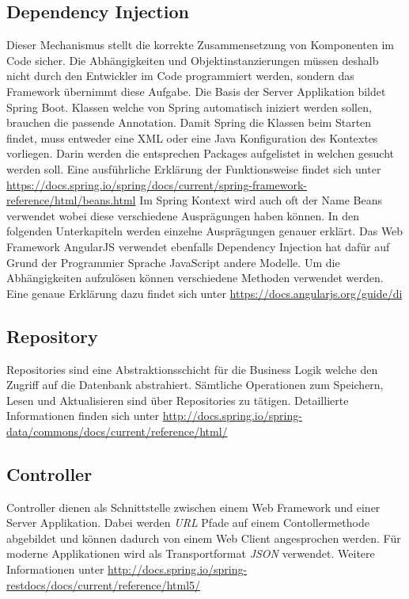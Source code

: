 \subsection{Dependency Injection}

Dieser Mechanismus stellt die korrekte Zusammensetzung von Komponenten im Code sicher. Die Abhängigkeiten und Objektinstanzierungen  müssen deshalb nicht durch den Entwickler im Code programmiert werden, sondern das Framework übernimmt diese Aufgabe. Die Basis der Server Applikation bildet Spring Boot. Klassen welche von Spring automatisch iniziert werden sollen, brauchen die passende Annotation.
Damit Spring die Klassen beim Starten findet, muss entweder eine XML oder eine Java Konfiguration des Kontextes vorliegen. Darin werden die entsprechen Packages aufgelistet in welchen gesucht werden soll. Eine ausführliche Erklärung der Funktionsweise findet sich unter \url{https://docs.spring.io/spring/docs/current/spring-framework-reference/html/beans.html}\newline
Im Spring Kontext wird auch oft der Name Beans verwendet wobei diese verschiedene Ausprägungen haben können. In den folgenden Unterkapiteln werden einzelne Ausprägungen genauer erklärt.\newline
Das Web Framework AngularJS verwendet ebenfalls Dependency Injection hat dafür auf Grund der Programmier Sprache JavaScript andere Modelle. Um die Abhängigkeiten aufzulösen können verschiedene Methoden verwendet werden. Eine genaue Erklärung dazu findet sich unter \url{https://docs.angularjs.org/guide/di}

\subsection{Repository}

Repositories sind eine Abstraktionsschicht für die Business Logik welche den Zugriff auf die Datenbank abstrahiert. Sämtliche Operationen zum Speichern, Lesen und Aktualisieren sind über Repositories zu tätigen.  Detaillierte Informationen finden sich unter \url{http://docs.spring.io/spring-data/commons/docs/current/reference/html/}

\subsection{Controller}

Controller dienen als Schnittstelle zwischen einem Web Framework und einer Server Applikation. Dabei werden \textit{\gls{URL}} Pfade auf einem Contollermethode abgebildet und können dadurch von einem Web Client angesprochen werden. Für moderne Applikationen wird als Transportformat \textit{\gls{JSON}} verwendet. Weitere Informationen unter \url{http://docs.spring.io/spring-restdocs/docs/current/reference/html5/}

